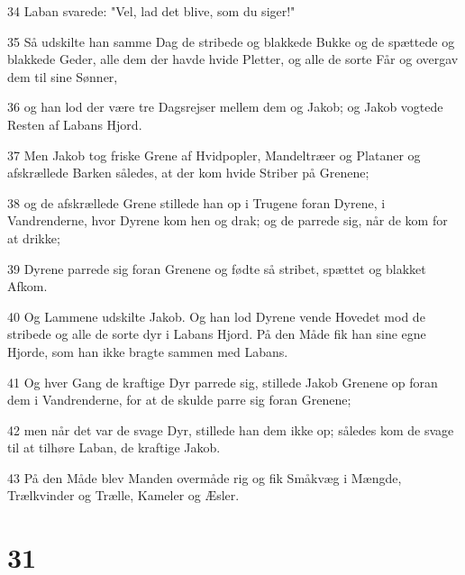 \par 34 Laban svarede: "Vel, lad det blive, som du siger!"
\par 35 Så udskilte han samme Dag de stribede og blakkede Bukke og de spættede og blakkede Geder, alle dem der havde hvide Pletter, og alle de sorte Får og overgav dem til sine Sønner,
\par 36 og han lod der være tre Dagsrejser mellem dem og Jakob; og Jakob vogtede Resten af Labans Hjord.
\par 37 Men Jakob tog friske Grene af Hvidpopler, Mandeltræer og Plataner og afskrællede Barken således, at der kom hvide Striber på Grenene;
\par 38 og de afskrællede Grene stillede han op i Trugene foran Dyrene, i Vandrenderne, hvor Dyrene kom hen og drak; og de parrede sig, når de kom for at drikke;
\par 39 Dyrene parrede sig foran Grenene og fødte så stribet, spættet og blakket Afkom.
\par 40 Og Lammene udskilte Jakob. Og han lod Dyrene vende Hovedet mod de stribede og alle de sorte dyr i Labans Hjord. På den Måde fik han sine egne Hjorde, som han ikke bragte sammen med Labans.
\par 41 Og hver Gang de kraftige Dyr parrede sig, stillede Jakob Grenene op foran dem i Vandrenderne, for at de skulde parre sig foran Grenene;
\par 42 men når det var de svage Dyr, stillede han dem ikke op; således kom de svage til at tilhøre Laban, de kraftige Jakob.
\par 43 På den Måde blev Manden overmåde rig og fik Småkvæg i Mængde, Trælkvinder og Trælle, Kameler og Æsler.

\chapter{31}

